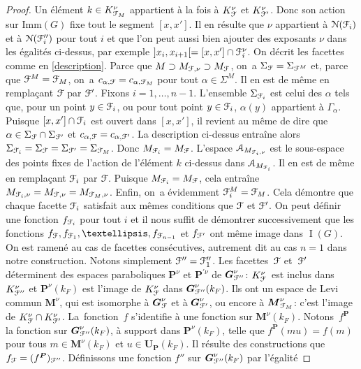 \documentclass[11pt]{article}
\numberwithin{equation}{section}\providecommand{\og}{«\,}\providecommand{\fg}{\,»}
\let\mathcal \EuScript
\newcommand{\Imm}{\mathrm{Imm}}
\DeclareMathOperator{\rI}{I}
\newcommand{\bG}{\boldsymbol{G}}
\newcommand{\bM}{\boldsymbol{M}}
\newcommand{\bP}{\boldsymbol{P}}
\newcommand{\bU}{\boldsymbol{U}}
\newcommand{\cA}{\mathcal{A}}
\newcommand{\cF}{\mathcal{F}}
\newcommand{\cN}{\mathcal{N}}
\theoremstyle{plain}
\theoremstyle{definition}
\begin{document}
\begin{proof}
Un élément $k\in K_{\cF_{M}}^{\nu}$ appartient à la fois à $K_{\cF}^{\nu}$ et $K_{\cF'}^{\nu}$. Donc son action sur $\Imm(G)$ fixe tout le segment $[x,x']$. Il en résulte que $\nu$ appartient à $\cN(\cF_{i})$ et à $\cN(\cF''_{i})$ pour tout $i$ et que l'on peut aussi bien ajouter des exposants $\nu$ dans les égalités ci-dessus, par exemple $]x_{i},x_{i+1}[=[x,x']\cap \cF_{i}^{\nu}$. On décrit les facettes comme en \ref{description}. Parce que $M\supset M_{\cF,\nu}\supset M_{\cF}$, on~a $\Sigma_{\cF}=\Sigma_{\cF^{M}}$ et, parce que $\cF^M=\cF_{M}$, on~a $c_{\alpha,\cF}=c_{\alpha,\cF_{M}}$ pour tout $\alpha\in \Sigma^M$. Il en est de même en remplaçant $\cF$ par $\cF'$. Fixons $i=1,\dots,n-1$. L'ensemble $\Sigma_{\cF_{i}}$ est celui des $\alpha$ tels que, pour un point $y\in \cF_{i}$, ou pour tout point $y\in \cF_{i}$, $\alpha(y)$ appartient à $\Gamma_{\alpha}$. Puisque $[x,x']\cap \cF_{i}$ est ouvert dans $[x,x']$, il revient au même de dire que $\alpha\in \Sigma_{\cF}\cap \Sigma_{\cF'}$ et $c_{\alpha,\cF}=c_{\alpha,\cF'}$. La description ci-dessus entraîne alors $\Sigma_{\cF_{i}}=\Sigma_{\cF}=\Sigma_{\cF'}=\Sigma_{\cF_{M}}$. Donc $M_{\cF_{i}}=M_{\cF}$. L'espace $\cA_{M_{\cF_{i},\nu}}$ est le sous-espace des points fixes de l'action de l'élément $k$ ci-dessus dans $\cA_{M_{\cF_{i}}}$. Il en est de même en remplaçant $\cF_{i}$ par $\cF$. Puisque $M_{\cF_{i}}=M_{\cF}$, cela entraîne $M_{\cF_{i},\nu}=M_{\cF,\nu}=M_{\cF_{M},\nu}$. Enfin, on~a évidemment $\cF_{i}^M=\cF_{M}$. Cela démontre que chaque facette $\cF_{i}$ satisfait aux mêmes conditions que $\cF$ et $\cF'$. On peut définir une fonction $f_{\cF_{i}}$ pour tout $i$ et il nous suffit de démontrer successivement que les fonctions $f_{\cF}, f_{\cF_{1}},\dots,f_{\cF_{n-1}}$ et $f_{\cF'}$ ont même image dans $\rI(G)$. On est ramené au cas de facettes consécutives, autrement dit au cas $n=1$ dans notre construction. Notons simplement $\cF''=\cF''_{1}$. Les facettes~$\cF$ et~$\cF'$ déterminent des espaces paraboliques $\bP^{\nu}$ et $\bP^{\prime\nu}$ de $\bG_{\cF''}^{\nu}$: $K_{\cF}^{\nu}$~est inclus dans $ K_{\cF''}^{\nu}$ et $\bP^{\nu}(k_{F})$ est l'image de $K_{\cF}^{\nu}$ dans $\bG_{\cF''}^{\nu}(k_{F})$. Ils ont un espace de Levi commun $\bM^{\nu}$, qui est isomorphe à $\bG_{\cF}^{\nu}$ et à $\bG_{\cF'}^{\nu}$, ou encore à $\bM_{\cF_{M}}^{\nu}$: c'est l'image de $K_{\cF}^{\nu}\cap K_{\cF'}^{\nu}$. La~fonction~$f$ s'identifie à une fonction sur $\bM^{\nu}(k_{F})$. Notons~$f^{\bP}$ la fonction sur $\bG_{\cF''}^{\nu}(k_{F})$, à support dans $\bP^{\nu}(k_{F})$, telle que $f^{\bP}(mu)=f(m)$ pour tous $m\in \bM^{\nu}(k_{F})$ et $u\in \bU_{\bP}(k_{F})$. Il résulte des constructions que $f_{\cF}=(f^{\bP})_{\cF''}$. Définissons une fonction $f''$ sur $\bG^{\nu}_{\cF''}(k_{F})$ par l'égalité

\end{proof}
\end{document}
